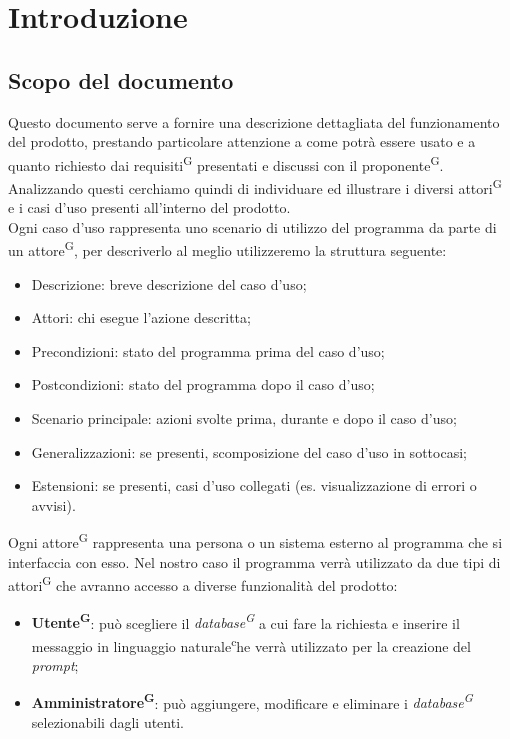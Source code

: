 \section{Introduzione}
\subsection{Scopo del documento}
Questo documento serve a fornire una descrizione dettagliata del funzionamento del prodotto, prestando particolare attenzione a come potrà essere usato e a quanto richiesto dai requisiti\textsuperscript{G} presentati e discussi con il proponente\textsuperscript{G}.
Analizzando questi cerchiamo quindi di individuare ed illustrare i diversi attori\textsuperscript{G} e i casi d’uso presenti all’interno del prodotto.\\
Ogni caso d’uso rappresenta uno scenario di utilizzo del programma da parte di un attore\textsuperscript{G}, per descriverlo al meglio utilizzeremo la struttura seguente:
\begin{itemize}
	\item Descrizione: breve descrizione del caso d'uso;
	\item Attori: chi esegue l'azione descritta;
	\item Precondizioni: stato del programma prima del caso d'uso;
	\item Postcondizioni: stato del programma dopo il caso d'uso;
	\item Scenario principale: azioni svolte prima, durante e dopo il caso d'uso;
	\item Generalizzazioni: se presenti, scomposizione del caso d'uso in sottocasi;
	\item Estensioni: se presenti, casi d'uso collegati (es. visualizzazione di errori o avvisi).
\end{itemize}
Ogni attore\textsuperscript{G} rappresenta una persona o un sistema esterno al programma che si interfaccia con esso.
Nel nostro caso il programma verrà utilizzato da due tipi di attori\textsuperscript{G} che avranno accesso a diverse funzionalità del prodotto:
\begin{itemize}
	\item \textbf{Utente\textsuperscript{G}}: può scegliere il \textit{database\textsuperscript{G}} a cui fare la richiesta e inserire il messaggio in linguaggio naturale\textsuperscript che verrà utilizzato per la creazione del \textit{prompt};
	\item \textbf{Amministratore\textsuperscript{G}}: può aggiungere, modificare e eliminare i \textit{database\textsuperscript{G}} selezionabili dagli utenti.
\end{itemize} %

